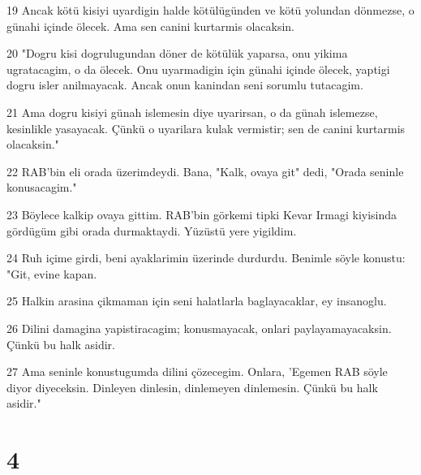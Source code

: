 \par 19 Ancak kötü kisiyi uyardigin halde kötülügünden ve kötü yolundan dönmezse, o günahi içinde ölecek. Ama sen canini kurtarmis olacaksin.
\par 20 "Dogru kisi dogrulugundan döner de kötülük yaparsa, onu yikima ugratacagim, o da ölecek. Onu uyarmadigin için günahi içinde ölecek, yaptigi dogru isler anilmayacak. Ancak onun kanindan seni sorumlu tutacagim.
\par 21 Ama dogru kisiyi günah islemesin diye uyarirsan, o da günah islemezse, kesinlikle yasayacak. Çünkü o uyarilara kulak vermistir; sen de canini kurtarmis olacaksin."
\par 22 RAB'bin eli orada üzerimdeydi. Bana, "Kalk, ovaya git" dedi, "Orada seninle konusacagim."
\par 23 Böylece kalkip ovaya gittim. RAB'bin görkemi tipki Kevar Irmagi kiyisinda gördügüm gibi orada durmaktaydi. Yüzüstü yere yigildim.
\par 24 Ruh içime girdi, beni ayaklarimin üzerinde durdurdu. Benimle söyle konustu: "Git, evine kapan.
\par 25 Halkin arasina çikmaman için seni halatlarla baglayacaklar, ey insanoglu.
\par 26 Dilini damagina yapistiracagim; konusmayacak, onlari paylayamayacaksin. Çünkü bu halk asidir.
\par 27 Ama seninle konustugumda dilini çözecegim. Onlara, 'Egemen RAB söyle diyor diyeceksin. Dinleyen dinlesin, dinlemeyen dinlemesin. Çünkü bu halk asidir."

\chapter{4}


